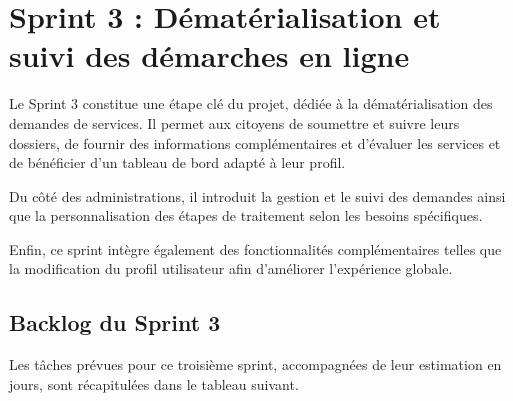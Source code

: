 \section{Sprint 3 : Dématérialisation et suivi des démarches en ligne}

Le Sprint 3 constitue une étape clé du projet, dédiée à la dématérialisation des demandes de services. Il permet aux citoyens de soumettre et suivre leurs dossiers, de fournir des informations complémentaires et d’évaluer les services et de bénéficier d'un tableau de bord adapté à leur profil.  

Du côté des administrations, il introduit la gestion et le suivi des demandes ainsi que la personnalisation des étapes de traitement selon les besoins spécifiques.

Enfin, ce sprint intègre également des fonctionnalités complémentaires telles que la modification du profil utilisateur afin d’améliorer l’expérience globale.


\subsection{Backlog du Sprint 3}
Les tâches prévues pour ce troisième sprint, accompagnées de leur estimation en jours, sont récapitulées dans le tableau suivant. 


